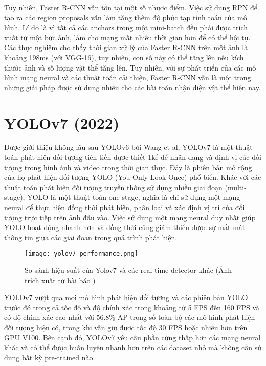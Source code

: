 Tuy nhiên, Faster R-CNN vẫn tồn tại một số nhược điểm. Việc sử dụng RPN để tạo ra các region proposals vẫn làm tăng thêm độ phức tạp tính toán của mô hình. Lí do là vì tất cả các anchors trong một mini-batch đều phải được trích xuất từ một bức ảnh, làm cho mạng mất nhiều thời gian hơn để có thể hội tụ. Các thực nghiệm cho thấy thời gian xử lý của Faster R-CNN trên một ảnh là khoảng 198ms (với VGG-16), tuy nhiên, con số này có thể tăng lên nếu kích thước ảnh và số lượng vật thể tăng lên. Tuy nhiên, với sự phát triển của các mô hình mạng neural và các thuật toán cải thiện, Faster R-CNN vẫn là một trong những giải pháp được sử dụng nhiều cho các bài toán nhận diện vật thể hiện nay.

\section{YOLOv7 (2022)}

Được giới thiệu không lâu sau YOLOv6 bởi Wang et al, YOLOv7 \cite{wang2022yolov7} là một thuật toán phát hiện đối tượng tiên tiến được thiết 1kế để nhận dạng và định vị các đối tượng trong hình ảnh và video trong thời gian thực. Đây là phiên bản mở rộng của họ phát hiện đối tượng YOLO (You Only Look Once) phổ biến. Khác với các thuật toán phát hiện đối tượng truyền thống sử dụng nhiều giai đoạn (multi-stage), YOLO là một thuật toán one-stage, nghĩa là chỉ sử dụng một mạng neural để thực hiện đồng thời phát hiện, phân loại và xác định vị trí của đối tượng trực tiếp trên ảnh đầu vào. Việc sử dụng một mạng neural duy nhất giúp YOLO hoạt động nhanh hơn và đồng thời cũng giảm thiểu được sự mất mát thông tin giữa các giai đoạn trong quá trình phát hiện. 

\begin{figure}[h]
	\center
	\texttt{[image: yolov7-performance.png]}
	\caption{So sánh hiệu suất của Yolov7 và các real-time detector khác \textmd{(Ảnh trích xuất từ bài báo \citep{wang2022yolov7})}}
\end{figure}

YOLOv7 vượt qua mọi mô hình phát hiện đối tượng và các phiên bản YOLO trước đó trong cả tốc độ và độ chính xác trong khoảng từ 5 FPS đến 160 FPS và có độ chính xác cao nhất với 56.8\% AP trong số toàn bộ các mô hình phát hiện đối tượng hiện có, trong khi vẫn giữ được tốc độ 30 FPS hoặc nhiều hơn trên GPU V100. Bên cạnh đó, YOLOv7 yêu cầu phần cứng thấp hơn các mạng neural khác và có thể được huấn luyện nhanh hơn trên các dataset nhỏ mà không cần sử dụng bất kỳ pre-trained nào.

